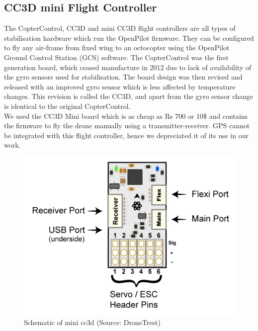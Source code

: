 \subsection{CC3D mini Flight Controller}
The CopterControl, CC3D and mini CC3D flight controllers are all types of stabilisation hardware which run the OpenPilot firmware. They can be configured to fly any air-frame from fixed wing to an octocopter using the OpenPilot Ground Control Station (GCS) software. The CopterControl was the first generation board, which ceased manufacture in 2012 due to lack of availability of the gyro sensors used for stabilisation. The board design was then revised and released with an improved gyro sensor which is less affected by temperature changes. This revision is called the CC3D, and apart from the gyro sensor change is identical to the original CopterControl.
\\
We used the CC3D Mini board which is as cheap as Rs 700 or 10\$ and contains the firmware to fly the drone manually using a transmitter-receiver. GPS cannot be integrated with this flight controller, hence we depreciated it of its use in our work. 

\begin{figure}[H]
    \centering
    \includegraphics[scale=0.35]{SummerInterReport/project/Images-Major/cc3d.png}
    \caption{Schematic of mini cc3d (Source: DroneTrest)}
    \label{fig:compEy}
\end{figure}
